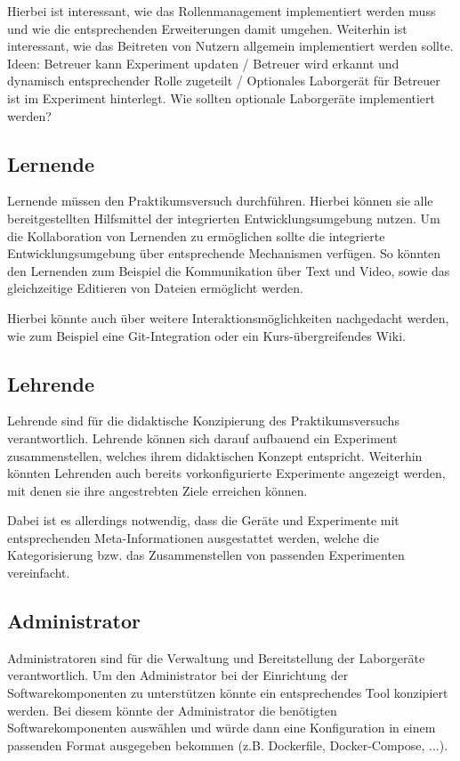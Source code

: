 \begin{note}
    Hierbei ist interessant, wie das Rollenmanagement implementiert werden muss und wie die entsprechenden Erweiterungen damit umgehen. Weiterhin ist interessant, wie das Beitreten von Nutzern allgemein implementiert werden sollte. Ideen: Betreuer kann Experiment updaten / Betreuer wird erkannt und dynamisch entsprechender Rolle zugeteilt / Optionales Laborgerät für Betreuer ist im Experiment hinterlegt. Wie sollten optionale Laborgeräte implementiert werden?
\end{note}

\subsection{Lernende}

Lernende müssen den Praktikumsversuch durchführen. Hierbei können sie alle bereitgestellten Hilfsmittel der integrierten Entwicklungsumgebung nutzen. Um die Kollaboration von Lernenden zu ermöglichen sollte die integrierte Entwicklungsumgebung über entsprechende Mechanismen verfügen. So könnten den Lernenden zum Beispiel die Kommunikation über Text und Video, sowie das gleichzeitige Editieren von Dateien ermöglicht werden.

\begin{note}
    Hierbei könnte auch über weitere Interaktionsmöglichkeiten nachgedacht werden, wie zum Beispiel eine Git-Integration oder ein Kurs-übergreifendes Wiki.
\end{note}

\subsection{Lehrende}

Lehrende sind für die didaktische Konzipierung des Praktikumsversuchs verantwortlich. Lehrende können sich darauf aufbauend ein Experiment zusammenstellen, welches ihrem didaktischen Konzept entspricht. Weiterhin könnten Lehrenden auch bereits vorkonfigurierte Experimente angezeigt werden, mit denen sie ihre angestrebten Ziele erreichen können.

\begin{note}
    Dabei ist es allerdings notwendig, dass die Geräte und Experimente mit entsprechenden Meta-Informationen ausgestattet werden, welche die Kategorisierung bzw. das Zusammenstellen von passenden Experimenten vereinfacht.
\end{note}

\subsection{Administrator}

Administratoren sind für die Verwaltung und Bereitstellung der Laborgeräte verantwortlich. Um den Administrator bei der Einrichtung der Softwarekomponenten zu unterstützen könnte ein entsprechendes Tool konzipiert werden. Bei diesem könnte der Administrator die benötigten Softwarekomponenten auswählen und würde dann eine Konfiguration in einem passenden Format ausgegeben bekommen (z.B. Dockerfile, Docker-Compose, ...).